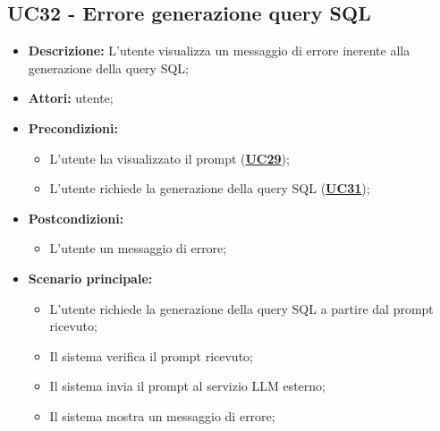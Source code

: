\subsection{UC32 - Errore generazione query SQL}
\label{sec:UC32}
\begin{itemize}
	\item \textbf{Descrizione:} L'utente visualizza un messaggio di errore inerente alla generazione della query SQL;
	\item \textbf{Attori:} utente;
	\item \textbf{Precondizioni:} 
	\begin{itemize}
		\item L'utente ha visualizzato il prompt (\hyperref[sec:UC29]{\textbf{UC29}});
		\item L'utente richiede la generazione della query SQL (\hyperref[sec:UC31]{\textbf{UC31}});
	\end{itemize}
	\item \textbf{Postcondizioni:} 
	\begin{itemize}
		\item L'utente un messaggio di errore;
	\end{itemize}
	\item \textbf{Scenario principale:}
	\begin{itemize}
		\item L'utente richiede la generazione della query SQL a partire dal prompt ricevuto;
		\item Il sistema verifica il prompt ricevuto;
		\item Il sistema invia il prompt al servizio LLM esterno;
		\item Il sistema mostra un messaggio di errore;
	\end{itemize}
\end{itemize}

